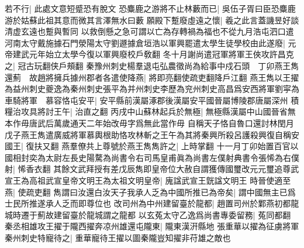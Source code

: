 若不行|{
	此處文意短蹙恐有脫文}
恐麋鹿之游將不止林藪而已|{
	吳伍子胥曰臣恐麋鹿游於姑蘇此祖其意而微其言澤無水曰藪}
願殿下蹔廢虛遠之懷|{
	羲之此言蓋譏昱好談清虚玄遠也蹔與暫同}
以救倒懸之急可謂以亡為存轉禍為福也不從九月浩屯泗口遣河南太守戴施據石門滎陽太守劉遯據倉垣浩以軍興罷遣太學生徒學校由此遂廢|{
	元帝建武元年始立太學今復以軍興廢校戶敎翻}
冬十月謝尚遣冠軍將軍王俠攻許昌克之|{
	冠古玩翻侠戶頰翻}
秦豫州刺史楊羣退屯弘農徵尚為給事中戍石頭　丁卯燕王雋還薊　故趙將擁兵據州郡者各遣使降燕|{
	將即亮翻使疏吏翻降戶江翻}
燕王雋以王擢為益州刺史夔逸為秦州刺史張平為并州刺史李歷為兖州刺史高昌爲安西將軍劉寜為車騎將軍　慕容恪屯安平|{
	安平縣前漢屬涿郡後漢屬安平國晉屬博陵郡唐屬深州}
積糧治攻具將討王午|{
	治直之翻}
丙戌中山蘇林起兵於無極|{
	無極縣漢屬中山國晉省無本作毋唐武后萬歲通天二年始改毋字爲無此當作毋}
自稱天子恪自魯口還討林閏月戊子燕王雋遣廣威將軍慕輿根助恪攻林斬之王午為其將秦興所殺呂護殺興復自稱安國王|{
	復扶又翻}
燕羣僚共上尊號於燕王雋雋許之|{
	上時掌翻}
十一月丁卯始置百官以國相封奕為太尉左長史陽騖為尚書令右司馬皇甫眞為尚書左僕射典書令張悕為右僕射|{
	悕香衣翻}
其餘文武拜授有差戊辰雋即皇帝位大赦自謂獲傳國璽改元元璽追尊武宣王為高祖武宣皇帝文明王為太祖文明皇帝|{
	廆諡武宣王皝諡文明王}
時晉使適至燕|{
	使疏吏翻}
雋謂曰汝還白汝天子我承人乏為中國所推已為帝矣|{
	謂中國無主已爲士民所推遂承人乏而即尊位也}
改司州為中州建留臺於龍都|{
	趙置司州於鄴燕初都龍城時遷于薊故建留臺於龍城謂之龍都}
以玄菟太守乙逸爲尚書專委留務|{
	菟同都翻}
秦丞相雄攻王擢于隴西擢奔凉州雄還屯隴東|{
	隴東漢汧縣地}
張重華以擢為征虜將軍秦州刺史特寵待之|{
	重華寵待王擢以圖秦隴豈知擢非苻雄之敵也}


